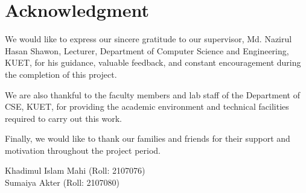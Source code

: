\chapter*{Acknowledgment}

We would like to express our sincere gratitude to our supervisor, Md. Nazirul Hasan Shawon, Lecturer, Department of Computer Science and Engineering, KUET, for his guidance, valuable feedback, and constant encouragement during the completion of this project.

We are also thankful to the faculty members and lab staff of the Department of CSE, KUET, for providing the academic environment and technical facilities required to carry out this work.

Finally, we would like to thank our families and friends for their support and motivation throughout the project period.

\vspace{1cm}
\noindent
Khadimul Islam Mahi (Roll: 2107076)\\
Sumaiya Akter (Roll: 2107080)
